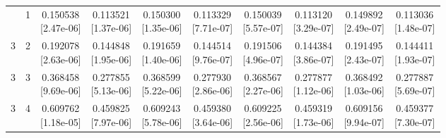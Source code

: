 \documentclass[12pt,letterpaper]{article}
\theoremstyle{plain}
\theoremstyle{definition}
\begin{document}
\begin{table}[p]
\begin{adjustbox}{max width=\linewidth}
\begin{tabular}{@{}rr*{8}{c}@{}}
\addlinespace[2pt]
3 & 1 & \shortstack{0.150538\\[-1pt]{\scriptsize[2.47e-06]}} & \shortstack{0.113521\\[-1pt]{\scriptsize[1.37e-06]}} & \shortstack{0.150300\\[-1pt]{\scriptsize[1.35e-06]}} & \shortstack{0.113329\\[-1pt]{\scriptsize[7.71e-07]}} & \shortstack{0.150039\\[-1pt]{\scriptsize[5.57e-07]}} & \shortstack{0.113120\\[-1pt]{\scriptsize[3.29e-07]}} & \shortstack{0.149892\\[-1pt]{\scriptsize[2.49e-07]}} & \shortstack{0.113036\\[-1pt]{\scriptsize[1.48e-07]}}\\
3 & 2 & \shortstack{0.192078\\[-1pt]{\scriptsize[2.63e-06]}} & \shortstack{0.144848\\[-1pt]{\scriptsize[1.95e-06]}} & \shortstack{0.191659\\[-1pt]{\scriptsize[1.40e-06]}} & \shortstack{0.144514\\[-1pt]{\scriptsize[9.76e-07]}} & \shortstack{0.191506\\[-1pt]{\scriptsize[4.96e-07]}} & \shortstack{0.144384\\[-1pt]{\scriptsize[3.86e-07]}} & \shortstack{0.191495\\[-1pt]{\scriptsize[2.43e-07]}} & \shortstack{0.144411\\[-1pt]{\scriptsize[1.93e-07]}}\\
3 & 3 & \shortstack{0.368458\\[-1pt]{\scriptsize[9.69e-06]}} & \shortstack{0.277855\\[-1pt]{\scriptsize[5.13e-06]}} & \shortstack{0.368599\\[-1pt]{\scriptsize[5.22e-06]}} & \shortstack{0.277930\\[-1pt]{\scriptsize[2.86e-06]}} & \shortstack{0.368567\\[-1pt]{\scriptsize[2.27e-06]}} & \shortstack{0.277877\\[-1pt]{\scriptsize[1.12e-06]}} & \shortstack{0.368492\\[-1pt]{\scriptsize[1.03e-06]}} & \shortstack{0.277887\\[-1pt]{\scriptsize[5.69e-07]}}\\
3 & 4 & \shortstack{0.609762\\[-1pt]{\scriptsize[1.18e-05]}} & \shortstack{0.459825\\[-1pt]{\scriptsize[7.97e-06]}} & \shortstack{0.609243\\[-1pt]{\scriptsize[5.78e-06]}} & \shortstack{0.459380\\[-1pt]{\scriptsize[3.64e-06]}} & \shortstack{0.609225\\[-1pt]{\scriptsize[2.56e-06]}} & \shortstack{0.459319\\[-1pt]{\scriptsize[1.73e-06]}} & \shortstack{0.609156\\[-1pt]{\scriptsize[9.94e-07]}} & \shortstack{0.459377\\[-1pt]{\scriptsize[7.30e-07]}}\\

\end{tabular}
\end{adjustbox}
\end{table}
\end{document}
